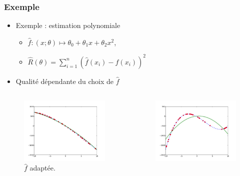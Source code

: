 \documentclass[c]{beamer}
\begin{document}
\begin{frame}
  \frametitle{Exemple}

  \begin{itemize}
    \item Exemple : estimation polynomiale
      \begin{itemize}
        \item $\hat{f} : (x; \theta) \mapsto \theta_0 + \theta_1 x + \theta_2 x^2$,
        \item $\hat{R}(\theta) = \sum_{i = 1}^n \left( \hat{f}(x_i) - f(x_i) \right)^2$
      \end{itemize}
    \item Qualit\'e d\'ependante du choix de $\hat{f}$
  \end{itemize}
  \begin{columns}
    \begin{column}{.5\textwidth}
      \begin{figure}
        \centering
        \includegraphics[width=.9\textwidth]{regression_good-choice}
        \caption{$\hat{f}$ adapt\'ee.}
      \end{figure}
    \end{column}
    \begin{column}{.5\textwidth}
      \begin{figure}
        \centering
        \includegraphics[width=.9\textwidth]{regression_poor-choice}

\end{figure}
\end{column}
\end{columns}
\end{frame}
\end{document}
